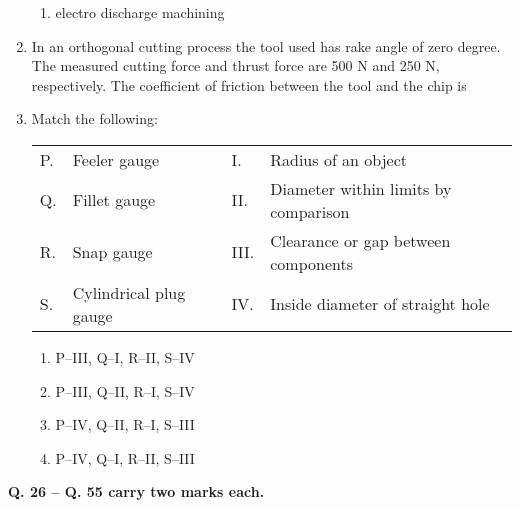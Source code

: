 \documentclass[journal,11pt,onecolumn]{IEEEtran}
\begin{document}
\begin{enumerate}
\begin{enumerate}
              \item electro discharge machining

          \end{enumerate}

    \item In an orthogonal cutting process the tool used has rake angle of zero degree. The measured cutting force and thrust force are 500 N and 250 N, respectively. The coefficient of friction between the tool and the chip is \underline{\hspace{2cm}}

    \item Match the following:

          \begin{table}[H]
              \centering
              \begin{tabular}{|l|l|l|l|}
                  \hline
                  P. & Feeler gauge           & I.   & Radius of an object                  \\
                  Q. & Fillet gauge           & II.  & Diameter within limits by comparison \\
                  R. & Snap gauge             & III. & Clearance or gap between components  \\
                  S. & Cylindrical plug gauge & IV.  & Inside diameter of straight hole     \\
                  \hline
              \end{tabular}
              \label{t25}
          \end{table}

          \begin{enumerate}

              \item P–III, Q–I, R–II, S–IV

              \item P–III, Q–II, R–I, S–IV

              \item P–IV, Q–II, R–I, S–III

              \item P–IV, Q–I, R–II, S–III

          \end{enumerate}

\end{enumerate}

\normalsize\textbf{Q. 26 – Q. 55 carry two marks each.}\\
\end{document}
